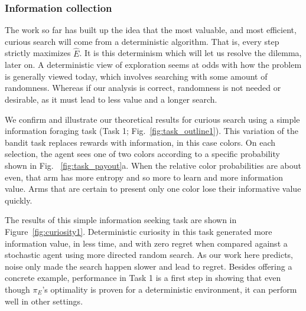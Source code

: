 \subsubsection*{Information collection}
The work so far has built up the idea that the most valuable, and most efficient, curious search will come from a deterministic algorithm. That is, every step strictly maximizes $\hat E$. It is this determinism which will let us resolve the dilemma, later on. A deterministic view of exploration seems at odds with how the problem is generally viewed today, which involves searching with some amount of randomness. Whereas if our analysis is correct, randomness is not needed or desirable, as it must lead to less value and a longer search. 

We confirm and illustrate our theoretical results for curious search using a simple information foraging task (Task 1; Fig.~\ref{fig:task_outline1}). This variation of the bandit task \cite{Sutton2018} replaces rewards with information, in this case colors. On each selection, the agent sees one of two colors according to a specific probability shown in Fig. ~\ref{fig:task_payout}a. When the relative color probabilities are about even, that arm has more entropy and so more to learn and more information value. Arms that are certain to present only one color lose their informative value quickly.

The results of this simple information seeking task are shown in Figure~\ref{fig:curiosity1}. Deterministic curiosity in this task generated more information value, in less time, and with zero regret when compared against a stochastic agent using more directed random search. As our work here predicts, noise only made the search happen slower and lead to regret. Besides offering a concrete example, performance in Task 1 is a first step in showing that even though $\pi_E$'s optimality is proven for a deterministic environment, it can perform well in other settings.

